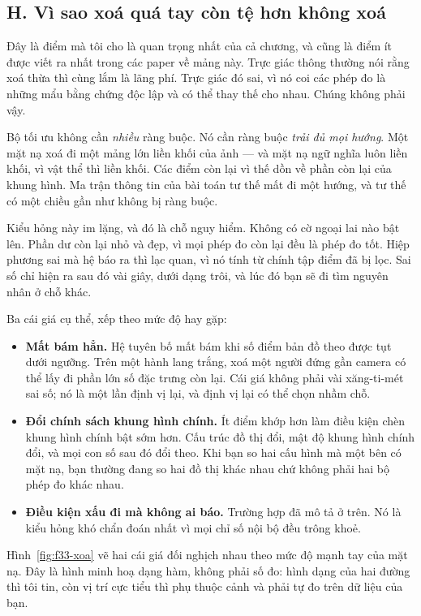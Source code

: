 \documentclass[../../deep_learning.tex]{subfiles}
\begin{document}
\subsection{H. Vì sao xoá quá tay còn tệ hơn không xoá}
Đây là điểm mà tôi cho là quan trọng nhất của cả chương, và cũng là điểm ít được viết ra nhất trong các paper về mảng này. Trực giác thông thường nói rằng xoá thừa thì cùng lắm là lãng phí. Trực giác đó sai, vì nó coi các phép đo là những mẩu bằng chứng độc lập và có thể thay thế cho nhau. Chúng không phải vậy.

Bộ tối ưu không cần \emph{nhiều} ràng buộc. Nó cần ràng buộc \emph{trải đủ mọi hướng}. Một mặt nạ xoá đi một mảng lớn liền khối của ảnh --- và mặt nạ ngữ nghĩa luôn liền khối, vì vật thể thì liền khối. Các điểm còn lại vì thế dồn về phần còn lại của khung hình. Ma trận thông tin của bài toán tư thế mất đi một hướng, và tư thế có một chiều gần như không bị ràng buộc.

Kiểu hỏng này im lặng, và đó là chỗ nguy hiểm. Không có cờ ngoại lai nào bật lên. Phần dư còn lại nhỏ và đẹp, vì mọi phép đo còn lại đều là phép đo tốt. Hiệp phương sai mà hệ báo ra thì lạc quan, vì nó tính từ chính tập điểm đã bị lọc. Sai số chỉ hiện ra sau đó vài giây, dưới dạng trôi, và lúc đó bạn sẽ đi tìm nguyên nhân ở chỗ khác.

Ba cái giá cụ thể, xếp theo mức độ hay gặp:

\begin{itemize}
\item \textbf{Mất bám hẳn.} Hệ tuyên bố mất bám khi số điểm bản đồ theo được tụt dưới ngưỡng. Trên một hành lang trắng, xoá một người đứng gần camera có thể lấy đi phần lớn số đặc trưng còn lại. Cái giá không phải vài xăng-ti-mét sai số; nó là một lần định vị lại, và định vị lại có thể chọn nhầm chỗ.
\item \textbf{Đổi chính sách khung hình chính.} Ít điểm khớp hơn làm điều kiện chèn khung hình chính bật sớm hơn. Cấu trúc đồ thị đổi, mật độ khung hình chính đổi, và mọi con số sau đó đổi theo. Khi bạn so hai cấu hình mà một bên có mặt nạ, bạn thường đang so hai đồ thị khác nhau chứ không phải hai bộ phép đo khác nhau.
\item \textbf{Điều kiện xấu đi mà không ai báo.} Trường hợp đã mô tả ở trên. Nó là kiểu hỏng khó chẩn đoán nhất vì mọi chỉ số nội bộ đều trông khoẻ.
\end{itemize}

Hình~\ref{fig:f33-xoa} vẽ hai cái giá đối nghịch nhau theo mức độ mạnh tay của mặt nạ. Đây là hình minh hoạ dạng hàm, không phải số đo: hình dạng của hai đường thì tôi tin, còn vị trí cực tiểu thì phụ thuộc cảnh và phải tự đo trên dữ liệu của bạn.
\end{document}
